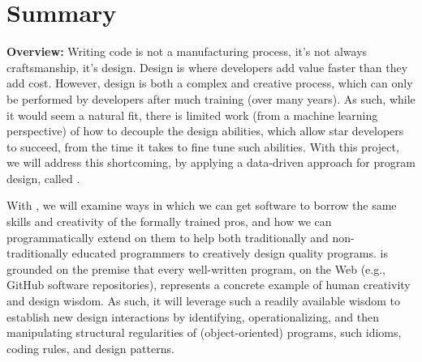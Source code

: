 
\setcounter{section}{1}
\section{Summary \mytitle}

%


{\bf{Overview:}}
%
Writing code is not a manufacturing process, it's not 
always craftsmanship, it's design. Design is where developers add 
value faster than they add cost. However, design is both a complex 
and creative process, which can only be performed by developers after 
much training (over many years). As such, while it would seem a natural 
fit, there is limited work (from a machine learning perspective) 
of how to decouple the design abilities, which allow star developers to 
succeed, from the time it takes to fine tune such abilities. With this 
project, we will address this shortcoming, by applying a data-driven 
approach for program design, called \pdm. 

With \pdm, we will examine ways in which we can get software to borrow 
the same skills and creativity of the formally trained pros, and how 
we can programmatically extend on them to help both traditionally and 
non-traditionally educated programmers to creatively design quality programs. 
\pdm is grounded on the premise that every well-written program, on the 
Web (e.g., GitHub software repositories), represents a concrete example 
of human creativity and design wisdom. As such, it will leverage such a 
readily available wisdom to establish new design interactions by 
identifying, operationalizing, and then manipulating structural 
regularities of (object-oriented) programs, such idioms, coding rules, 
and design patterns.



